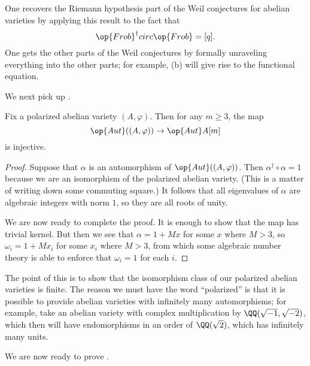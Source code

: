 \documentclass[../notes.tex]{subfiles}
\begin{document}
\begin{remark}
	One recovers the Riemann hypothesis part of the Weil conjectures for abelian varieties by applying this result to the fact that
	\[{\op{Frob}^\dagger}circ{\op{Frob}}=[q].\]
	One gets the other parts of the Weil conjectures by formally unraveling everything into the other parts; for example, (b) will give rise to the functional equation.
\end{remark}
We next pick up \cite[Theorem~21.5]{mumford}.
\begin{theorem} \label{thm:pav-finite-aut}
	Fix a polarized abelian variety $(A,\varphi)$. Then for any $m\ge3$, the map
	\[\op{Aut}((A,\varphi))\to\op{Aut}A[m]\]
	is injective.
\end{theorem}
\begin{proof}
	Suppose that $\alpha$ is an automorphism of $\op{Aut}((A,\varphi))$. Then $\alpha^\dagger\circ\alpha=1$ because we are an isomorphism of the polarized abelian variety. (This is a matter of writing down some commuting square.\todo{}) It follows that all eigenvalues of $\alpha$ are algebraic integers with norm $1$, so they are all roots of unity.

	We are now ready to complete the proof. It is enough to show that the map has trivial kernel. But then we see that $\alpha=1+Mx$ for some $x$ where $M>3$, so $\omega_i=1+Mx_i$ for some $x_i$ where $M>3$, from which some algebraic number theory is able to enforce that $\omega_i=1$ for each $i$.
\end{proof}
\begin{remark}
	The point of this is to show that the isomorphism class of our polarized abelian varieties is finite. The reason we must have the word ``polarized'' is that it is possible to provide abelian varieties with infinitely many automorphisms; for example, take an abelian variety with complex multiplication by $\QQ(\sqrt{-1},\sqrt{-2})$, which then will have endomorphisms in an order of $\QQ(\sqrt2)$, which has infinitely many units.
\end{remark}
We are now ready to prove .
\end{document}
